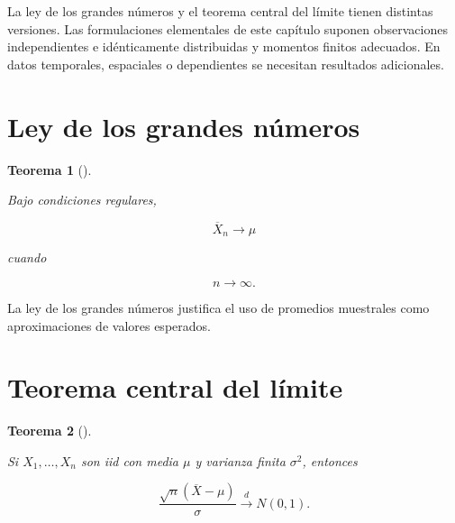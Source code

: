 \documentclass[
  spanish,
  10.5pt,
  letterpaper,
  DIV=11,
  numbers=noendperiod,
  oneside,
  open=any]{scrreprt}
\theoremstyle{definition}
\theoremstyle{definition}
\theoremstyle{plain}
\newtheorem{theorem}{Teorema}[chapter]
\theoremstyle{remark}
\begin{document}
\begin{tcolorbox}[enhanced jigsaw, arc=.35mm, bottomrule=.15mm, bottomtitle=1mm, breakable, colback=white, colbacktitle=quarto-callout-warning-color!10!white, colframe=quarto-callout-warning-color-frame, coltitle=black, left=2mm, leftrule=.75mm, opacityback=0, opacitybacktitle=0.6, rightrule=.15mm, title=\textcolor{quarto-callout-warning-color}{\faExclamationTriangle}\hspace{0.5em}{Supuestos de los resultados asintóticos}, titlerule=0mm, toprule=.15mm, toptitle=1mm]

La ley de los grandes números y el teorema central del límite tienen
distintas versiones. Las formulaciones elementales de este capítulo
suponen observaciones independientes e idénticamente distribuidas y
momentos finitos adecuados. En datos temporales, espaciales o
dependientes se necesitan resultados adicionales.

\end{tcolorbox}

\section*{Ley de los grandes
números}\label{ley-de-los-grandes-nuxfameros}


\begin{theorem}[]\protect\hypertarget{thm-ley-grandes-numeros}{}\label{thm-ley-grandes-numeros}

Bajo condiciones regulares,

\[
\overline{X}_n
\longrightarrow
\mu
\]

cuando

\[
n\to\infty.
\]

\end{theorem}

La ley de los grandes números justifica el uso de promedios muestrales
como aproximaciones de valores esperados.

\section*{Teorema central del
límite}\label{teorema-central-del-luxedmite}


\begin{theorem}[]\protect\hypertarget{thm-teorema-central-limite}{}\label{thm-teorema-central-limite}

Si \(X_1,\ldots,X_n\) son iid con media \(\mu\) y varianza finita
\(\sigma^2\), entonces

\[
\frac{
\sqrt{n}
(\overline{X}-\mu)
}{
\sigma
}
\overset{d}{\longrightarrow}
N(0,1).
\]

\end{theorem}
\end{document}
